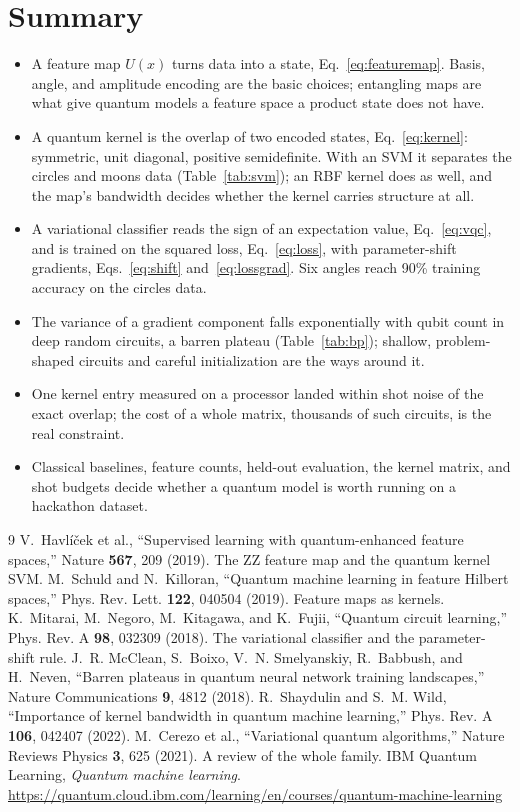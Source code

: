 \documentclass[11pt]{article}
\begin{document}
\section{Summary}

\begin{itemize}
\item A feature map $U(x)$ turns data into a state, Eq.~\eqref{eq:featuremap}. Basis, angle, and amplitude encoding are the basic choices; entangling maps are what give quantum models a feature space a product state does not have.
\item A quantum kernel is the overlap of two encoded states, Eq.~\eqref{eq:kernel}: symmetric, unit diagonal, positive semidefinite. With an SVM it separates the circles and moons data (Table~\ref{tab:svm}); an RBF kernel does as well, and the map's bandwidth decides whether the kernel carries structure at all.
\item A variational classifier reads the sign of an expectation value, Eq.~\eqref{eq:vqc}, and is trained on the squared loss, Eq.~\eqref{eq:loss}, with parameter-shift gradients, Eqs.~\eqref{eq:shift} and~\eqref{eq:lossgrad}. Six angles reach 90\% training accuracy on the circles data.
\item The variance of a gradient component falls exponentially with qubit count in deep random circuits, a barren plateau (Table~\ref{tab:bp}); shallow, problem-shaped circuits and careful initialization are the ways around it.
\item One kernel entry measured on a processor landed within shot noise of the exact overlap; the cost of a whole matrix, thousands of such circuits, is the real constraint.
\item Classical baselines, feature counts, held-out evaluation, the kernel matrix, and shot budgets decide whether a quantum model is worth running on a hackathon dataset.
\end{itemize}

\begin{thebibliography}{9}
 V.~Havl\'i\v{c}ek et al., ``Supervised learning with quantum-enhanced feature spaces,'' Nature \textbf{567}, 209 (2019). The ZZ feature map and the quantum kernel SVM.
 M.~Schuld and N.~Killoran, ``Quantum machine learning in feature Hilbert spaces,'' Phys. Rev. Lett. \textbf{122}, 040504 (2019). Feature maps as kernels.
 K.~Mitarai, M.~Negoro, M.~Kitagawa, and K.~Fujii, ``Quantum circuit learning,'' Phys. Rev. A \textbf{98}, 032309 (2018). The variational classifier and the parameter-shift rule.
 J.~R. McClean, S.~Boixo, V.~N. Smelyanskiy, R.~Babbush, and H.~Neven, ``Barren plateaus in quantum neural network training landscapes,'' Nature Communications \textbf{9}, 4812 (2018).
 R.~Shaydulin and S.~M. Wild, ``Importance of kernel bandwidth in quantum machine learning,'' Phys. Rev. A \textbf{106}, 042407 (2022).
 M.~Cerezo et al., ``Variational quantum algorithms,'' Nature Reviews Physics \textbf{3}, 625 (2021). A review of the whole family.
 IBM Quantum Learning, \emph{Quantum machine learning}. \url{https://quantum.cloud.ibm.com/learning/en/courses/quantum-machine-learning}
\end{thebibliography}
\end{document}

